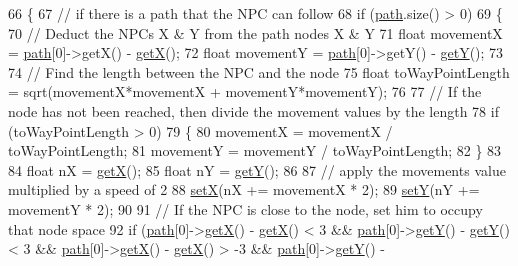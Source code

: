 \begin{DoxyCode}
66 \{
67     \textcolor{comment}{// if there is a path that the NPC can follow}
68     \textcolor{keywordflow}{if} (\hyperlink{class_n_p_c_afdd6b1a6e4827259ec9d9fcd075cb099}{path}.size() > 0)
69     \{
70         \textcolor{comment}{// Deduct the NPCs X & Y from the path nodes X & Y}
71         \textcolor{keywordtype}{float} movementX = \hyperlink{class_n_p_c_afdd6b1a6e4827259ec9d9fcd075cb099}{path}[0]->getX() - \hyperlink{class_sprite_a03d6c82bddfd3d164ce8997482c57c85}{getX}();
72         \textcolor{keywordtype}{float} movementY = \hyperlink{class_n_p_c_afdd6b1a6e4827259ec9d9fcd075cb099}{path}[0]->getY() - \hyperlink{class_sprite_a53ea8b27bcd0dab0627a2dceab2b9d98}{getY}();
73 
74         \textcolor{comment}{// Find the length between the NPC and the node}
75         \textcolor{keywordtype}{float} toWayPointLength = sqrt(movementX*movementX + movementY*movementY);
76         
77         \textcolor{comment}{// If the node has not been reached, then divide the movement values by the length}
78         \textcolor{keywordflow}{if} (toWayPointLength > 0)
79         \{
80             movementX = movementX / toWayPointLength;
81             movementY = movementY / toWayPointLength;
82         \}
83 
84         \textcolor{keywordtype}{float} nX = \hyperlink{class_sprite_a03d6c82bddfd3d164ce8997482c57c85}{getX}();
85         \textcolor{keywordtype}{float} nY = \hyperlink{class_sprite_a53ea8b27bcd0dab0627a2dceab2b9d98}{getY}();
86 
87         \textcolor{comment}{// apply the movements value multiplied by a speed of 2}
88         \hyperlink{class_sprite_ae21322c28b8719af996990fafa920762}{setX}(nX += movementX * 2);
89         \hyperlink{class_sprite_afe7d6d636fc460358c40a403af259d0e}{setY}(nY += movementY * 2);
90 
91         \textcolor{comment}{// If the NPC is close to the node, set him to occupy that node space}
92         \textcolor{keywordflow}{if} (\hyperlink{class_n_p_c_afdd6b1a6e4827259ec9d9fcd075cb099}{path}[0]->\hyperlink{class_sprite_a03d6c82bddfd3d164ce8997482c57c85}{getX}() - \hyperlink{class_sprite_a03d6c82bddfd3d164ce8997482c57c85}{getX}() < 3 && \hyperlink{class_n_p_c_afdd6b1a6e4827259ec9d9fcd075cb099}{path}[0]->\hyperlink{class_sprite_a53ea8b27bcd0dab0627a2dceab2b9d98}{getY}() - 
      \hyperlink{class_sprite_a53ea8b27bcd0dab0627a2dceab2b9d98}{getY}() < 3 && \hyperlink{class_n_p_c_afdd6b1a6e4827259ec9d9fcd075cb099}{path}[0]->\hyperlink{class_sprite_a03d6c82bddfd3d164ce8997482c57c85}{getX}() - \hyperlink{class_sprite_a03d6c82bddfd3d164ce8997482c57c85}{getX}() > -3 && \hyperlink{class_n_p_c_afdd6b1a6e4827259ec9d9fcd075cb099}{path}[0]->\hyperlink{class_sprite_a53ea8b27bcd0dab0627a2dceab2b9d98}{getY}() - 

\end{DoxyCode}
